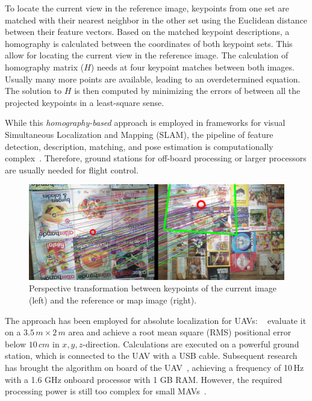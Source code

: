 \documentclass{report}
\begin{document}
To locate the current view in the reference image, keypoints from one
set are matched with their nearest neighbor in the other set using the
Euclidean distance between their feature vectors. Based on the matched
keypoint descriptions, a homography is calculated between the
coordinates of both keypoint sets. This allow for locating the current
view in the reference image. The calculation of homography matrix
($H$) needs at four keypoint matches between both images. Usually many
more points are available, leading to an overdetermined equation. The
solution to $H$ is then computed by minimizing the errors of between
all the projected keypoints in a least-square sense.

While this \emph{homography-based} approach is employed in frameworks
for visual Simultaneous Localization and Mapping (SLAM), the pipeline
of feature detection, description, matching, and pose estimation is
computationally complex~\cite{kendall2015posenet}. Therefore, ground
stations for off-board processing or larger processors are usually
needed for flight control.


\begin{figure}[h!]
\begin{center}
\includegraphics[width=0.85\columnwidth]{sift}
\caption{{Perspective transformation between keypoints of the current
    image (left) and the reference or map image (right).%
  }}
\end{center}
\end{figure}

The approach has been employed for absolute localization for UAVs:
\citeauthor{blosch2010vision}~\cite{blosch2010vision} evaluate it on a
$3.5\,m \times 2\,m$ area and achieve a root mean square (RMS)
positional error below $10\,cm$ in $x,y,z$-direction. Calculations are
executed on a powerful ground station, which is connected to the UAV
with a USB cable. Subsequent research has brought the algorithm on
board of the UAV~\cite{achtelik2011onboard}, achieving a frequency of
10\,Hz with a 1.6 GHz onboard processor with 1 GB RAM. However, the
required processing power is still too complex for small
MAVs~\cite{de2009design}.
\end{document}
